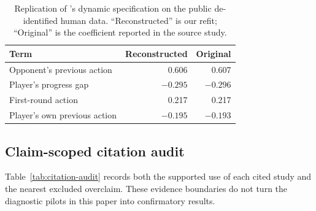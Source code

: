 \documentclass[sigconf]{aamas}
\begin{document}
\begin{table}[h]
    \caption{Replication of \citet{falling_behind_unsafe}'s dynamic
    specification on the public de-identified human data. ``Reconstructed''
    is our refit; ``Original'' is the coefficient reported in the source
    study.}
    \label{tab:human-replication}
    \centering
    \small
    \begin{tabular}{@{}lrr@{}}
        \toprule
        Term & Reconstructed & Original \\
        \midrule
        Opponent's previous action & 0.606  & 0.607  \\
        Player's progress gap      & $-0.295$ & $-0.296$ \\
        First-round action         & 0.217  & 0.217  \\
        Player's own previous action & $-0.195$ & $-0.193$ \\
        \bottomrule
    \end{tabular}
\end{table}

\subsection{Claim-scoped citation audit}
\label{app:citation-audit}

Table~\ref{tab:citation-audit} records both the supported use of each cited
study and the nearest excluded overclaim. These evidence boundaries do not
turn the diagnostic pilots in this paper into confirmatory results.
\end{document}
